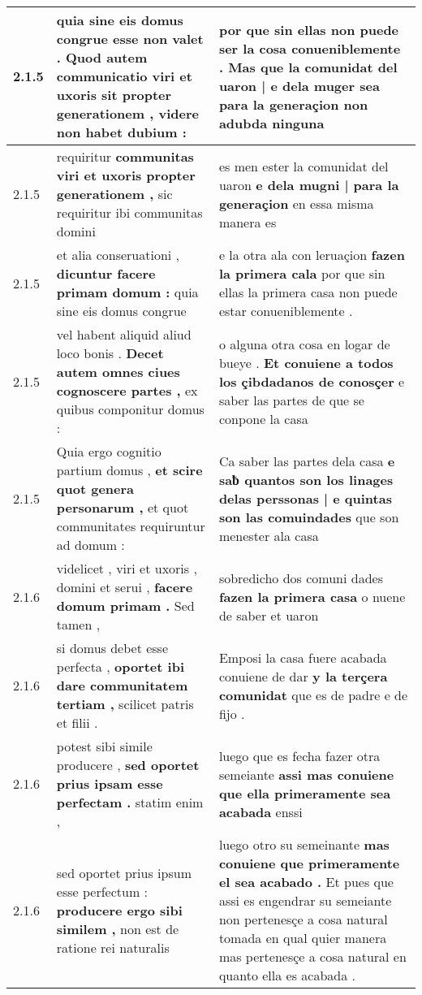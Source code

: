 \begin{tabular}{|p{1cm}|p{6.5cm}|p{6.5cm}|}
2.1.5 & quia sine eis domus congrue esse non valet . \textbf{ Quod autem communicatio viri et uxoris sit propter generationem , } videre non habet dubium : & por que sin ellas non puede ser la cosa conueniblemente . \textbf{ Mas que la comunidat del uaron | e dela muger sea } para la generaçion non adubda ninguna \\\hline
2.1.5 & requiritur \textbf{ communitas viri et uxoris propter generationem , } sic requiritur ibi communitas domini & es men ester la comunidat del uaron \textbf{ e dela mugni | para la generaçion } en essa misma manera es \\\hline
2.1.5 & et alia conseruationi , \textbf{ dicuntur facere primam domum : } quia sine eis domus congrue & e la otra ala con leruaçion \textbf{ fazen la primera cala } por que sin ellas la primera casa non puede estar conueniblemente . \\\hline
2.1.5 & vel habent aliquid aliud loco bonis . \textbf{ Decet autem omnes ciues cognoscere partes , } ex quibus componitur domus : & o alguna otra cosa en logar de bueye . \textbf{ Et conuiene a todos los çibdadanos de conosçer } e saber las partes de que se conpone la casa \\\hline
2.1.5 & Quia ergo cognitio partium domus , \textbf{ et scire quot genera personarum , } et quot communitates requiruntur ad domum : & Ca saber las partes dela casa \textbf{ e saƀ quantos son los linages delas perssonas | e quintas son las comuindades } que son menester ala casa \\\hline
2.1.6 & videlicet , viri et uxoris , domini et serui , \textbf{ facere domum primam . } Sed tamen , & sobredicho dos comuni dades \textbf{ fazen la primera casa } o nuene de saber et uaron \\\hline
2.1.6 & si domus debet esse perfecta , \textbf{ oportet ibi dare communitatem tertiam , } scilicet patris et filii . & Emposi la casa fuere acabada conuiene de dar \textbf{ y la terçera comunidat } que es de padre e de fijo . \\\hline
2.1.6 & potest sibi simile producere , \textbf{ sed oportet prius ipsam esse perfectam . } statim enim , & luego que es fecha fazer otra semeiante \textbf{ assi mas conuiene que ella primeramente sea acabada } enssi \\\hline
2.1.6 & sed oportet prius ipsum esse perfectum : \textbf{ producere ergo sibi similem , } non est de ratione rei naturalis & luego otro su semeinante \textbf{ mas conuiene que primeramente el sea acabado . } Et pues que assi es engendrar su semeiante non pertenesçe a cosa natural tomada en qual quier manera mas pertenesçe a cosa natural en quanto ella es acabada . \\\hline

\end{tabular}
